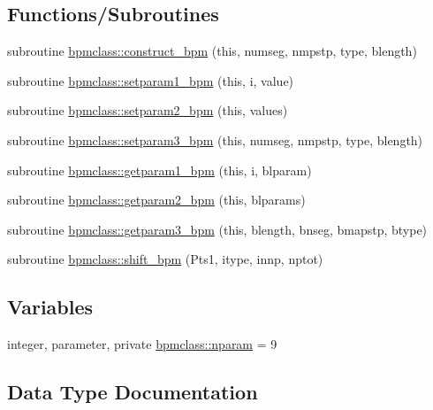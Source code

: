 \subsection*{Functions/\+Subroutines}
\begin{DoxyCompactItemize}
\item 
subroutine \mbox{\hyperlink{namespacebpmclass_a777700e03d6422437747b159baf8ac47}{bpmclass\+::construct\+\_\+bpm}} (this, numseg, nmpstp, type, blength)
\item 
subroutine \mbox{\hyperlink{namespacebpmclass_ac6cf17939baa6ee32b20af627036c73e}{bpmclass\+::setparam1\+\_\+bpm}} (this, i, value)
\item 
subroutine \mbox{\hyperlink{namespacebpmclass_a37f4e426713e3624ee853c1343294cab}{bpmclass\+::setparam2\+\_\+bpm}} (this, values)
\item 
subroutine \mbox{\hyperlink{namespacebpmclass_a75a67023bf7f429ccd2ef12a435077a7}{bpmclass\+::setparam3\+\_\+bpm}} (this, numseg, nmpstp, type, blength)
\item 
subroutine \mbox{\hyperlink{namespacebpmclass_ac5588f058f6a85c7c6c131ca7172065d}{bpmclass\+::getparam1\+\_\+bpm}} (this, i, blparam)
\item 
subroutine \mbox{\hyperlink{namespacebpmclass_ae88ec9feb4f283a3914a0859b14dc8dc}{bpmclass\+::getparam2\+\_\+bpm}} (this, blparams)
\item 
subroutine \mbox{\hyperlink{namespacebpmclass_a290f2f59ee0b68d7f56e678b87f43393}{bpmclass\+::getparam3\+\_\+bpm}} (this, blength, bnseg, bmapstp, btype)
\item 
subroutine \mbox{\hyperlink{namespacebpmclass_af08cf75c879f797ae8f03ba69e95d628}{bpmclass\+::shift\+\_\+bpm}} (Pts1, itype, innp, nptot)
\end{DoxyCompactItemize}
\subsection*{Variables}
\begin{DoxyCompactItemize}
\item 
integer, parameter, private \mbox{\hyperlink{namespacebpmclass_ac2f2f373976236d08c9c68de895950eb}{bpmclass\+::nparam}} = 9
\end{DoxyCompactItemize}


\subsection{Data Type Documentation}
\label{structbpmclass_1_1bpm}
